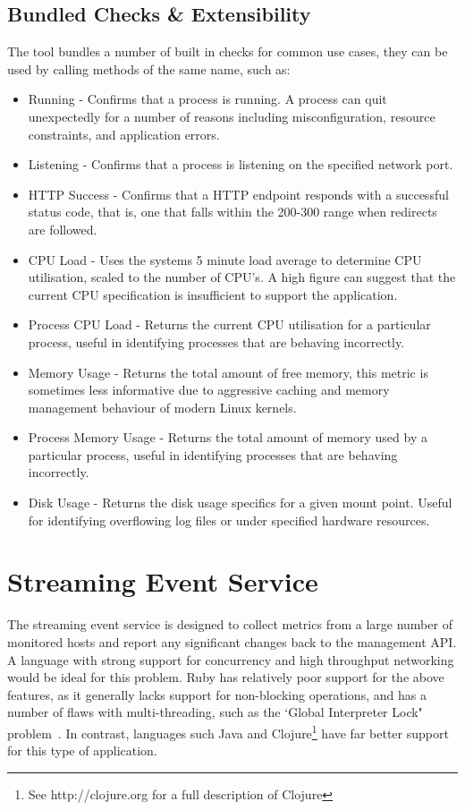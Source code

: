 \documentclass{cshonours}
\begin{document}
\pagebreak
\subsection{Bundled Checks \& Extensibility}
\label{bundledchecks}

The tool bundles a number of built in checks for common use cases, they can be used by calling methods of the same name, such as:

\begin{itemize}
  \item {Running} - Confirms that a process is running. A process can quit unexpectedly for a number of reasons including misconfiguration, resource constraints, and application errors.
  \item {Listening} - Confirms that a process is listening on the specified network port.
  \item {HTTP Success} - Confirms that a HTTP endpoint responds with a successful status code, that is, one that falls within the 200-300 range when redirects are followed.
  \item {CPU Load} - Uses the systems 5 minute load average to determine CPU utilisation, scaled to the number of CPU's. A high figure can suggest that the current CPU specification is insufficient to support the application.
  \item {Process CPU Load} - Returns the current CPU utilisation for a particular process, useful in identifying processes that are behaving incorrectly.
  \item {Memory Usage} - Returns the total amount of free memory, this metric is sometimes less informative due to aggressive caching and memory management behaviour of modern Linux kernels.
  \item {Process Memory Usage} - Returns the total amount of memory used by a particular process, useful in identifying processes that are behaving incorrectly.
  \item {Disk Usage} - Returns the disk usage specifics for a given mount point. Useful for identifying overflowing log files or under specified hardware resources.
\end{itemize}

\pagebreak
\section{Streaming Event Service}

The streaming event service is designed to collect metrics from a large number of monitored hosts and report any significant changes back to the management API\@. A language with strong support for concurrency and high throughput networking would be ideal for this problem. Ruby has relatively poor support for the above features, as it generally lacks support for non-blocking operations, and has a number of flaws with multi-threading, such as the `Global Interpreter Lock" problem~\cite{RubyGIL}. In contrast, languages such Java and Clojure\footnote{See http://clojure.org for a full description of Clojure} have far better support for this type of application.
\end{document}
